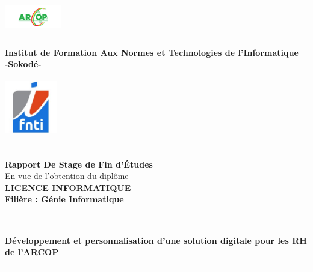 
\begin{titlepage}
	\begin{center}
		\begin{minipage}{2.5cm}
			\begin{center}
				\includegraphics[width=2.5cm,height=1.7cm]{images/logo/logo-arcop.png}

			\end{center}
		\end{minipage}\hfill
		\begin{minipage}{10cm}
			\begin{center}
				\textbf{ Institut de Formation Aux Normes et Technologies de l'Informatique}\\[0.1cm]
				\textbf{-Sokodé-}

			\end{center}
		\end{minipage}\hfill
		\begin{minipage}{2.5cm}
			\begin{center}
				\includegraphics[width=2.3cm,height=2.5cm]{images/logo/logo-ifnti.png}
			\end{center}

		\end{minipage}
		\textsc{\Large }\\[1.5cm]
		{\large \bfseries Rapport De Stage de Fin d'\uppercase{é}tudes}\\[0.5cm]
		{\large En vue de l'obtention du diplôme}\\[1cm]

		{\huge \bfseries \uppercase{Licence Informatique} \\[0.5cm] }
		{\large \bfseries Filière : Génie Informatique}
		\textsc{\Large }\\[1cm]

		\rule{\linewidth}{0.3mm} \\[0.4cm]
		{ \huge \bfseries\color{blue!70!black} Développement et personnalisation d’une solution digitale pour les RH de l’ARCOP \\[0.4cm] }
		\rule{\linewidth}{0.3mm} \\[1cm]


\end{center}
\end{titlepage}
